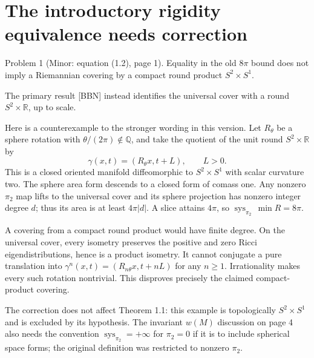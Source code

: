 \documentclass[10pt]{article}
\begin{document}
\section*{The introductory rigidity equivalence needs correction}
Problem 1 (Minor: equation (1.2), page 1).  Equality in the old \(8\pi\) bound does not imply a Riemannian covering by a compact round product \(S^2\times S^1\).\par
The primary result [BBN] instead identifies the universal cover with a round \(S^2\times\mathbb R\), up to scale.\par
Here is a counterexample to the stronger wording in this version. Let \(R_\theta\) be a sphere rotation with \(\theta/(2\pi)\notin\mathbb Q\), and take the quotient of the unit round \(S^2\times\mathbb R\) by \[\gamma(x,t)=(R_\theta x,t+L),\qquad L>0.\] This is a closed oriented manifold diffeomorphic to \(S^2\times S^1\) with scalar curvature two. The sphere area form descends to a closed form of comass one. Any nonzero \(\pi_2\) map lifts to the universal cover and its sphere projection has nonzero integer degree \(d\); thus its area is at least \(4\pi|d|\). A slice attains \(4\pi\), so \(\operatorname{sys}_{\pi_2}\,\min R=8\pi\).\par
A covering from a compact round product would have finite degree. On the universal cover, every isometry preserves the positive and zero Ricci eigendistributions, hence is a product isometry. It cannot conjugate a pure translation into \(\gamma^n(x,t)=(R_{n\theta}x,t+nL)\) for any \(n\ge1\). Irrationality makes every such rotation nontrivial. This disproves precisely the claimed compact-product covering.\par
The correction does not affect Theorem 1.1: this example is topologically \(S^2\times S^1\) and is excluded by its hypothesis. The invariant \(w(M)\) discussion on page 4 also needs the convention \(\operatorname{sys}_{\pi_2}=+\infty\) for \(\pi_2=0\) if it is to include spherical space forms; the original definition was restricted to nonzero \(\pi_2\).\par
\end{document}
